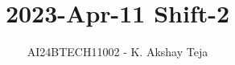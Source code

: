 \documentclass[journal,9pt,onecolumn]{IEEEtran}
\begin{document}

\vspace{3cm}

\title{2023-Apr-11 Shift-2}
\author{AI24BTECH11002 - K. Akshay Teja}
{\let\newpage\relax\maketitle}

\renewcommand{\thefigure}{\theenumi}
\renewcommand{\thetable}{\theenumi}
\setlength{\intextsep}{10pt} %

\renewcommand{\thetable}{\theenumi}
\end{document}
